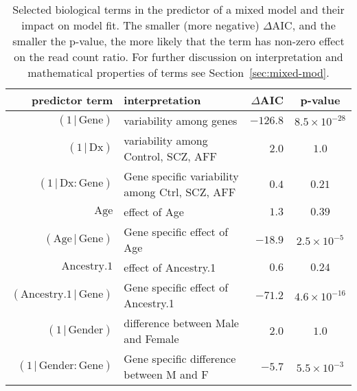 \documentclass[letterpaper]{article}
\begin{document}
\begin{table}
\begin{center}
\begin{tabular}{rlrc}
predictor term                              & interpretation&   \(\Delta\)AIC &        p-value \\
\hline
\((1\,|\,\mathrm{Gene})\)                   & variability among genes & \(-126.8\)  & \(8.5\times 10^{-28}\) \\
\((1\,|\,\mathrm{Dx})\)                     & variability among Control, SCZ, AFF & \(2.0\)  & \(1.0\)  \\
\((1\,|\,\mathrm{Dx}:\mathrm{Gene})\)       & Gene specific variability among Ctrl, SCZ, AFF & \(0.4\) &  \(0.21\) \\
\(\mathrm{Age}\)                            & effect of Age & \(1.3\)   & \(0.39\) \\
\((\mathrm{Age}\,|\,\mathrm{Gene})\)        & Gene specific effect of Age & \(-18.9\)  & \(2.5\times 10^{-5}\)  \\
\(\mathrm{Ancestry.1}\)                     & effect of Ancestry.1 & \(0.6\)  & \(0.24\) \\
\((\mathrm{Ancestry.1}\,|\,\mathrm{Gene})\) & Gene specific effect of Ancestry.1 & \(-71.2\)   & \(4.6\times 10^{-16}\) \\
\((1\,|\,\mathrm{Gender})\)                 & difference between Male and Female & \(2.0\)  & \(1.0\)  \\
\((1\,|\,\mathrm{Gender}:\mathrm{Gene})\)   & Gene specific difference between M and F & \(-5.7\) &  \(5.5\times 10^{-3}\) \\
\end{tabular}
\end{center}
\caption{Selected biological terms in the predictor of a mixed model and their impact on model fit.  The
smaller (more negative) \(\Delta \mathrm{AIC}\), and the smaller the p-value,
the more likely that the term has non-zero effect on the read count ratio.
For further discussion on interpretation and mathematical properties of terms see
Section~\ref{sec:mixed-mod}.
}
\label{tab:mod-sel}
\end{table}
\end{document}
